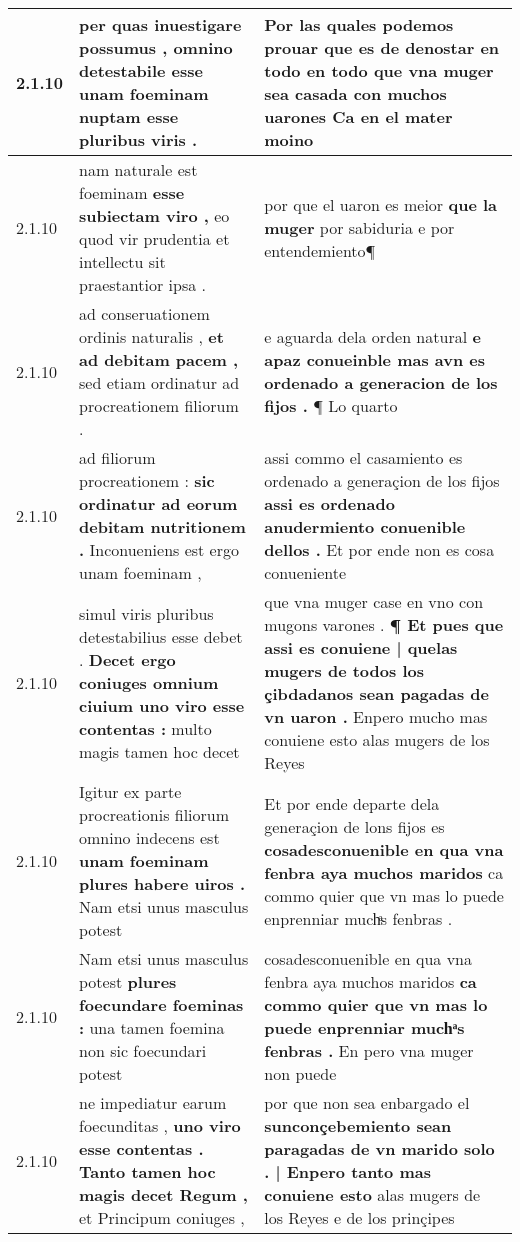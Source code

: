 \begin{tabular}{|p{1cm}|p{6.5cm}|p{6.5cm}|}
2.1.10 & per quas inuestigare possumus , \textbf{ omnino detestabile esse unam foeminam nuptam } esse pluribus viris . & Por las quales podemos prouar \textbf{ que es de denostar en todo en todo que vna muger sea casada con muchos uarones } Ca en el mater moino \\\hline
2.1.10 & nam naturale est foeminam \textbf{ esse subiectam viro , } eo quod vir prudentia et intellectu sit praestantior ipsa . & por que el uaron es meior \textbf{ que la muger } por sabiduria e por entendemiento¶ \\\hline
2.1.10 & ad conseruationem ordinis naturalis , \textbf{ et ad debitam pacem , } sed etiam ordinatur ad procreationem filiorum . & e aguarda dela orden natural \textbf{ e apaz conueinble mas avn es ordenado a generacion de los fijos . } ¶ Lo quarto \\\hline
2.1.10 & ad filiorum procreationem : \textbf{ sic ordinatur ad eorum debitam nutritionem . } Inconueniens est ergo unam foeminam , & assi commo el casamiento es ordenado a generaçion de los fijos \textbf{ assi es ordenado anudermiento conuenible dellos . } Et por ende non es cosa conueniente \\\hline
2.1.10 & simul viris pluribus detestabilius esse debet . \textbf{ Decet ergo coniuges omnium ciuium uno viro esse contentas : } multo magis tamen hoc decet & que vna muger case en vno con mugons varones . \textbf{ ¶ Et pues que assi es conuiene | quelas mugers de todos los çibdadanos sean pagadas de vn uaron . } Enpero mucho mas conuiene esto alas mugers de los Reyes \\\hline
2.1.10 & Igitur ex parte procreationis filiorum omnino indecens est \textbf{ unam foeminam plures habere uiros . } Nam etsi unus masculus potest & Et por ende departe dela generaçion de lons fijos es \textbf{ cosadesconuenible en qua vna fenbra aya muchos maridos } ca commo quier que vn mas lo puede enprenniar muchͣs fenbras . \\\hline
2.1.10 & Nam etsi unus masculus potest \textbf{ plures foecundare foeminas : } una tamen foemina non sic foecundari potest & cosadesconuenible en qua vna fenbra aya muchos maridos \textbf{ ca commo quier que vn mas lo puede enprenniar muchͣs fenbras . } En pero vna muger non puede \\\hline
2.1.10 & ne impediatur earum foecunditas , \textbf{ uno viro esse contentas . Tanto tamen hoc magis decet Regum , } et Principum coniuges , & por que non sea enbargado el \textbf{ sunconçebemiento sean paragadas de vn marido solo . | Enpero tanto mas conuiene esto } alas mugers de los Reyes e de los prinçipes \\\hline

\end{tabular}
